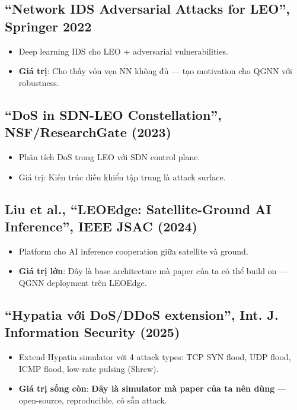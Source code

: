 \documentclass[11pt,a4paper]{article}
\begin{document}
\subsection{``Network IDS Adversarial Attacks for LEO'', Springer 2022}
\begin{itemize}
  \item Deep learning IDS cho LEO + adversarial vulnerabilities.
  \item \textbf{Giá trị}: Cho thấy vỏn vẹn NN không đủ --- tạo motivation cho QGNN với robustness.
\end{itemize}

\subsection{``DoS in SDN-LEO Constellation'', NSF/ResearchGate (2023)}
\begin{itemize}
  \item Phân tích DoS trong LEO với SDN control plane.
  \item Giá trị: Kiến trúc điều khiển tập trung là attack surface.
\end{itemize}

\subsection{Liu et al., ``LEOEdge: Satellite-Ground AI Inference'', IEEE JSAC (2024)}
\begin{itemize}
  \item Platform cho AI inference cooperation giữa satellite và ground.
  \item \textbf{Giá trị lớn}: Đây là base architecture mà paper của ta có thể build on --- QGNN deployment trên LEOEdge.
\end{itemize}

\subsection{``Hypatia với DoS/DDoS extension'', Int. J. Information Security (2025)}
\begin{itemize}
  \item Extend Hypatia simulator với 4 attack types: TCP SYN flood, UDP flood, ICMP flood, low-rate pulsing (Shrew).
  \item \textbf{Giá trị sống còn}: \textbf{Đây là simulator mà paper của ta nên dùng} --- open-source, reproducible, có sẵn attack.
\end{itemize}
\end{document}
